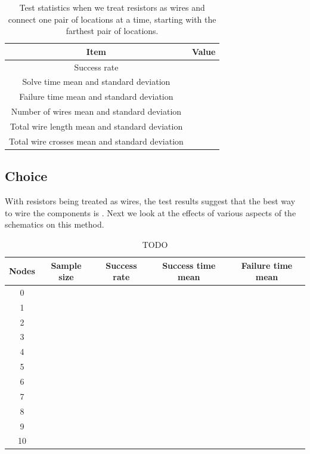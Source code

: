 \begin{table}[H]
\begin{center}
\begin{singlespace}
\begin{tabular}{| c | c |}
\hline
Item & Value \\
\hline\hline
Success rate & \\
Solve time mean and standard deviation & \\
Failure time mean and standard deviation & \\
Number of wires mean and standard deviation & \\
Total wire length mean and standard deviation & \\
Total wire crosses mean and standard deviation & \\
\hline
\end{tabular}
\end{singlespace}
\end{center}
\label{tb:as_wire_pair_l}
\caption{Test statistics when we treat resistors as wires and connect one
pair of locations at a time, starting with the farthest pair of locations.}
\end{table}

\subsection{Choice}

With resistors being treated as wires, the test results suggest that the best
way to wire the components is \q. Next we look at the effects of various aspects
of the schematics on this method.

\begin{table}[H]
\begin{center}
\begin{singlespace}
\begin{tabular}{| c | c | c | c | c |}
\hline
Nodes & Sample size & Success rate & Success time mean & Failure time mean\\
\hline\hline
0 & & & & \\
1 & & & & \\
2 & & & & \\
3 & & & & \\
4 & & & & \\
5 & & & & \\
6 & & & & \\
7 & & & & \\
8 & & & & \\
9 & & & & \\
10 & & & & \\
\hline
\end{tabular}
\end{singlespace}
\end{center}
\label{tb:TODO}
\caption{TODO}
\end{table}

